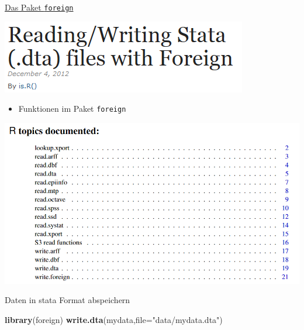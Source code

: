 \documentclass[ignorenonframetext,]{beamer}
\newenvironment{Shaded}{}{}
\newcommand{\KeywordTok}[1]{\textcolor[rgb]{0.00,0.44,0.13}{\textbf{{#1}}}}
\newcommand{\DataTypeTok}[1]{\textcolor[rgb]{0.56,0.13,0.00}{{#1}}}
\newcommand{\StringTok}[1]{\textcolor[rgb]{0.25,0.44,0.63}{{#1}}}
\newcommand{\NormalTok}[1]{{#1}}
\providecommand{\tightlist}{%
\setlength{\itemsep}{0pt}\setlength{\parskip}{0pt}}
\begin{document}
\begin{frame}[fragile]{\href{https://www.r-bloggers.com/readingwriting-stata-dta-files-with-foreign/}{Das
Paket \texttt{foreign}}}

\includegraphics{./tex2pdf.956/cacdeac9e2a94bf873762c46b11f6576b5bf7fd2.png}

\begin{itemize}
\tightlist
\item
  Funktionen im Paket \texttt{foreign}
\end{itemize}

\includegraphics{./tex2pdf.956/127b4a21c6edd4bea1001fe04e85f4f5a06b9ec8.png}

\end{frame}

\begin{frame}[fragile]{Daten in stata Format abspeichern}

\begin{Shaded}
\begin{Highlighting}[]
\KeywordTok{library}\NormalTok{(foreign)}
\KeywordTok{write.dta}\NormalTok{(mydata,}\DataTypeTok{file=}\StringTok{"data/mydata.dta"}\NormalTok{) }
\end{Highlighting}
\end{Shaded}

\end{frame}
\end{document}
